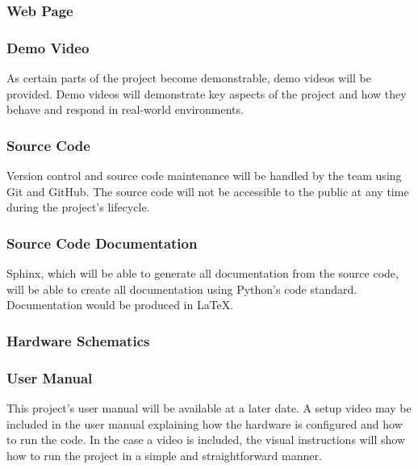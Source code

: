 \subsubsection{Web Page}

\subsubsection{Demo Video}
As certain parts of the project become demonstrable, demo videos will be provided. Demo videos will demonstrate key aspects of the project and how they behave and respond in real-world environments.

\subsubsection{Source Code}
Version control and source code maintenance will be handled by the team using Git and GitHub. The source code will not be accessible to the public at any time during the project's lifecycle.

\subsubsection{Source Code Documentation}
Sphinx, which will be able to generate all documentation from the source code, will be able to create all documentation using Python's code standard. Documentation would be produced in LaTeX.

\subsubsection{Hardware Schematics}

\subsubsection{User Manual}
This project's user manual will be available at a later date. A setup video may be included in the user manual explaining how the hardware is configured and how to run the code. In the case a video is included, the visual instructions will show how to run the project in a simple and straightforward manner.